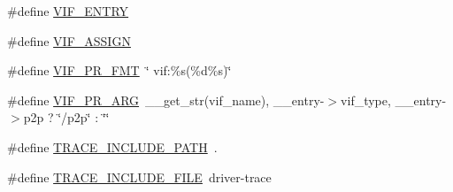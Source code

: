 \begin{DoxyCompactItemize}
\#define \hyperlink{driver-trace_8h_af9528f0b6f59f04b6c6ab283b1b65d9d}{V\-I\-F\-\_\-\-E\-N\-T\-R\-Y}
\item 
\#define \hyperlink{driver-trace_8h_af5ede80f04ffcb3f644f68837b1d252c}{V\-I\-F\-\_\-\-A\-S\-S\-I\-G\-N}
\item 
\#define \hyperlink{driver-trace_8h_a50711161ccfc99a73b43b988149a61a5}{V\-I\-F\-\_\-\-P\-R\-\_\-\-F\-M\-T}~\char`\"{} vif\-:\%s(\%d\%s)\char`\"{}
\item 
\#define \hyperlink{driver-trace_8h_a12c9f3afcd1c461f7ae2f86fd8503977}{V\-I\-F\-\_\-\-P\-R\-\_\-\-A\-R\-G}~\-\_\-\-\_\-get\-\_\-str(vif\-\_\-name), \-\_\-\-\_\-entry-\/$>$vif\-\_\-type, \-\_\-\-\_\-entry-\/$>$p2p ? \char`\"{}/p2p\char`\"{} \-: \char`\"{}\char`\"{}
\item 
\#define \hyperlink{driver-trace_8h_ac6a9ac061dda1a2beb782b3c9b44e77a}{T\-R\-A\-C\-E\-\_\-\-I\-N\-C\-L\-U\-D\-E\-\_\-\-P\-A\-T\-H}~.
\item 
\#define \hyperlink{driver-trace_8h_a1d5647dfae4ac3375129dfe95a164965}{T\-R\-A\-C\-E\-\_\-\-I\-N\-C\-L\-U\-D\-E\-\_\-\-F\-I\-L\-E}~driver-\/trace
\end{DoxyCompactItemize}
